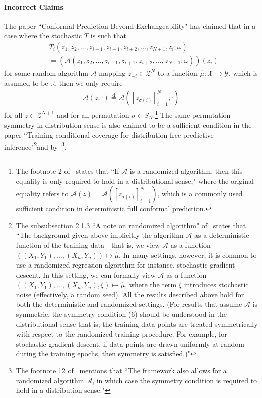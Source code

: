 \documentclass{article}
\newcommand{\oo}[1]{\left( #1 \right)}
\newcommand{\cc}[1]{\left[ #1 \right]}
\begin{document}
    \paragraph{Incorrect Claims}
    
    The paper ``Conformal Prediction Beyond Exchangeability"\citep{barber2023conformal} has claimed that in a case where the stochastic $T$ is such that
    \begin{align*}
        &T_i(z_1, z_2, \dots, z_{i-1}, z_{i+1}, z_{i+2}, \dots, z_{N+1}, z_i; \omega)\\&= \oo{\mathcal{A}(z_1, z_2, \dots, z_{i-1}, z_{i+1}, z_{i+2}, \dots, z_{N+1}; \omega)}\oo{z_i}
    \end{align*}
    for some random algorithm $\mathcal{A}$ mapping $z_{-i} \in \mathcal{Z}^{N}$ to a function $\hat{\mu}: \mathcal{X} \to \mathcal{Y}$, which is assumed to be $\mathbb{R}$, then we only require
    \begin{align*}
        \mathcal{A}\oo{z; \cdot} \overset{\text{d}}{=} \mathcal{A}\oo{\cc{z_{\sigma(i)}}_{i=1}^N; \cdot}
    \end{align*}
    for all $z \in \mathcal{Z}^{N+1}$ and for all permutation $\sigma \in S_N$.\footnote{The footnote 2 of~\citep{barber2023conformal} states that ``If $\mathcal{A}$ is a randomized algorithm, then this equality is only required to hold in a distributional sense," where the original equality refers to $\mathcal{A}\oo{z} =\mathcal{A}\oo{\cc{z_{\sigma(i)}}_{i=1}^N}$, which is a commonly used sufficient condition in deterministic full conformal prediction.} The same permutation symmetry in distribution sense is also claimed to be a sufficient condition in the paper ``Training-conditional coverage for distribution-free predictive inference"\citep{bian2023training}\footnote{The subsubsection 2.1.3 ``A note on randomized algorithm" of~\citep{bian2023training} states that ``The background given above implicitly  the algorithm $\mathcal{A}$ as a deterministic function of the training data—that is, we view $\mathcal{A}$ as a function $\oo{(X_1, Y_1), \dots, (X_n, Y_n)} \mapsto \hat{\mu}$. In many settings, however, it is common to use a randomized regression algorithm-for instance, stochastic gradient descent. In this setting, we can formally view $\mathcal{A}$ as a function $\oo{(X_1, Y_1), \dots, (X_n, Y_n), \xi} \mapsto \hat{\mu}$, where the term $\xi$ introduces stochastic noise (effectively, a random seed). All the results described above hold for both the deterministic and randomized settings. (For results that assume $\mathcal{A}$ is symmetric, the symmetry condition (6) should be understood in the distributional sense-that is, the training data points are treated symmetrically with respect to the randomized training procedure. For example, for stochastic gradient descent, if data points are drawn uniformly at random during the training epochs, then symmetry is satisfied.)"}and by~\cite{lee2023distribution}\footnote{The footnote 12 of~\cite{lee2023distribution} mentions that ``The framework also allows for a randomized algorithm $\mathcal{A}$, in which case the symmetry condition is required to hold in a distribution sense."}.
\end{document}
